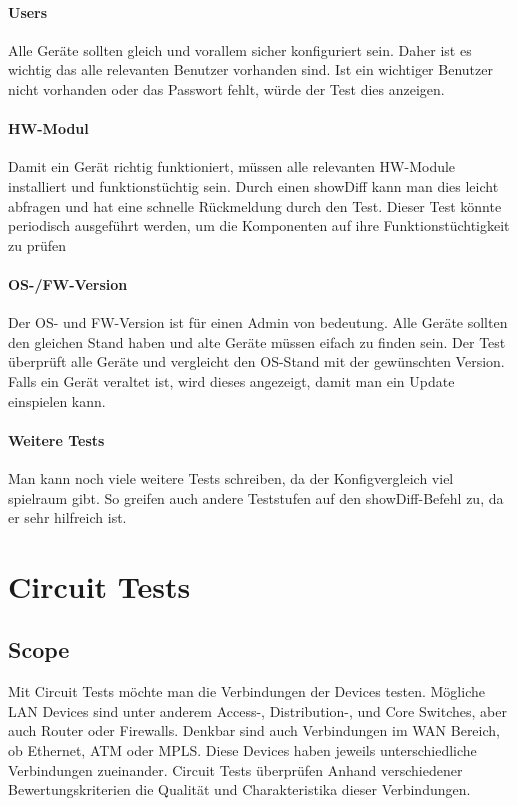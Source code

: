 \documentclass[a4,12pt]{scrartcl}
\begin{document}
\paragraph{Users}\newline
Alle Geräte sollten gleich und vorallem sicher konfiguriert sein. Daher ist es wichtig das alle relevanten Benutzer vorhanden sind. Ist ein wichtiger Benutzer nicht vorhanden oder das Passwort fehlt, würde der Test dies anzeigen.
\paragraph{HW-Modul}\newline
Damit ein Gerät richtig funktioniert, müssen alle relevanten HW-Module installiert und funktionstüchtig sein. Durch einen showDiff kann man dies leicht abfragen und hat eine schnelle Rückmeldung durch den Test. Dieser Test könnte periodisch ausgeführt werden, um die Komponenten auf ihre Funk­ti­ons­tüch­tig­keit zu prüfen
\paragraph{OS-/FW-Version}\newline
Der OS- und FW-Version ist für einen Admin von bedeutung. Alle Geräte sollten den gleichen Stand haben und alte Geräte müssen eifach zu finden sein. Der Test überprüft alle Geräte und vergleicht den OS-Stand mit der gewünschten Version. Falls ein Gerät veraltet ist, wird dieses angezeigt, damit man ein Update einspielen kann.
\paragraph{Weitere Tests}\newline
Man kann noch viele weitere Tests schreiben, da der Konfigvergleich viel spielraum gibt. So greifen auch andere Teststufen auf den showDiff-Befehl zu, da er sehr hilfreich ist. 
\newpage
\section{Circuit Tests}
\subsection{Scope}
Mit Circuit Tests möchte man die Verbindungen der Devices testen. Mögliche LAN Devices sind unter anderem Access-, Distribution-, und Core Switches, aber auch Router oder Firewalls. Denkbar sind auch Verbindungen im WAN Bereich, ob Ethernet, ATM oder MPLS. Diese Devices haben jeweils unterschiedliche Verbindungen zueinander. Circuit Tests überprüfen Anhand verschiedener Bewertungskriterien die Qualität und Charakteristika dieser Verbindungen.\\
\end{document}
